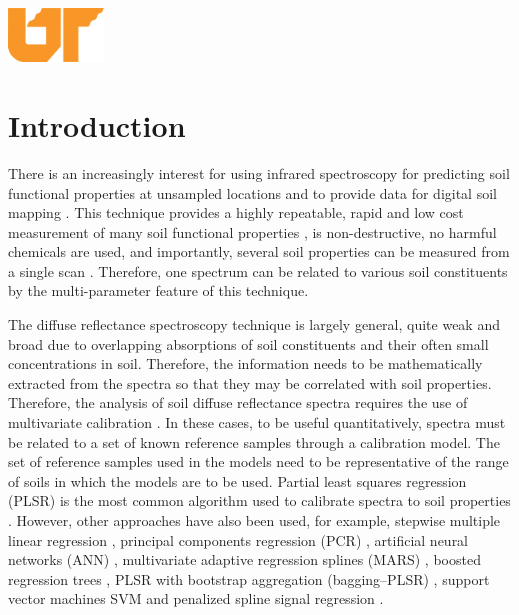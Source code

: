 \documentclass[12pt,letterpaper]{article}
\begin{document}
\begin{titlepage}

\includegraphics[width=1in]{logo.png}\\[1cm] %
 

\vfill %

\end{titlepage}


\section{Introduction}
There is an increasingly interest for using infrared spectroscopy for predicting soil functional properties at unsampled locations and to provide data for digital soil mapping \cite{kuang20124}. This technique provides a highly repeatable, rapid and low cost measurement of many soil functional properties \cite{viscarra2009improved}, is non-destructive, no harmful chemicals are used, and importantly, several soil properties can be measured from a single scan \cite{viscarra2006visible}. Therefore, one spectrum can be related to various soil constituents by the multi-parameter feature of this technique.

The diffuse reflectance spectroscopy technique is largely general, quite weak and broad due to overlapping absorptions of soil constituents and their often small concentrations in soil. Therefore, the information needs to be mathematically extracted from the spectra so that they may be correlated with soil properties. Therefore, the analysis of soil diffuse reflectance spectra requires the use of multivariate calibration \cite{martens1989multivariate}. In these cases, to be useful quantitatively, spectra must be related to a set of known reference samples through a calibration model. The set of reference samples used in the models need to be representative of the range of soils in which the models are to be used. Partial least squares regression (PLSR) is the most common algorithm used to calibrate spectra to soil properties \cite{wold1983multivariate}. However, other approaches have also been used, for example, stepwise multiple linear regression \cite{dalal1986simultaneous}, principal components regression (PCR) \cite{chang2001near}, artificial neural networks (ANN) \cite{daniel2003artificial}, multivariate adaptive regression splines (MARS) \cite{shepherd2002development}, boosted regression trees \cite{brown2006global}, PLSR with bootstrap aggregation (bagging--PLSR) \cite{viscarra2007robust}, support vector machines SVM and penalized spline signal regression \cite{stevens2008laboratory}.
\end{document}
